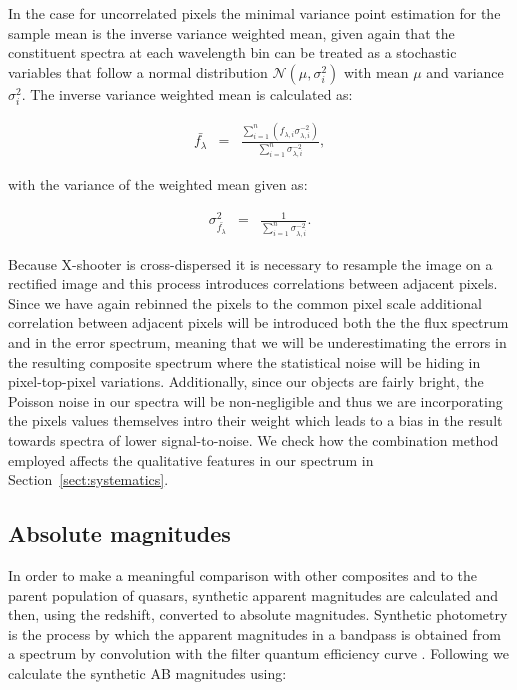 \documentclass{aa}    %
\newcommand{\eqlabel}[1]{\label{eq:#1}}
\newcommand{\sectionname}{Section}
\newcommand{\Sect}[1]{\sectionname~\ref{sect:#1}}
\newcommand{\sect}[1]{\Sect{#1}}
\newcommand{\sectlabel}[1]{\label{sect:#1}}
\begin{document}
In the case for uncorrelated pixels the minimal variance point estimation for the sample mean is the inverse variance weighted mean, given again that the constituent spectra at each wavelength bin can be treated as a stochastic variables that follow a normal distribution $\mathcal{N}(\mu, \sigma_i^2)$ with mean $\mu$ and variance $\sigma_i^2$. The inverse variance weighted mean is calculated as:

\begin{eqnarray} \eqlabel{wmean}
\bar{f_{\lambda}} &=& \frac{ \sum_{i=1}^n \left( f_{\lambda, i} \sigma_{\lambda, i}^{-2} \right)}{\sum_{i=1}^n \sigma_{\lambda, i}^{-2}},
\end{eqnarray}

with the variance of the weighted mean given as: 
 
\begin{eqnarray} \eqlabel{sigma-wmean}
\sigma_{\bar{f_{\lambda}}}^2 &=& \frac{ 1 }{\sum_{i=1}^n \sigma_{\lambda, i}^{-2}}.
\end{eqnarray}

Because X-shooter is cross-dispersed it is necessary to resample the image on a rectified image and this process introduces correlations between adjacent pixels. Since we have again rebinned the pixels to the common pixel scale additional correlation between adjacent pixels will be introduced both the the flux spectrum and in the error spectrum, meaning that we will be underestimating the errors in the resulting composite spectrum where the statistical noise will be hiding in pixel-top-pixel variations. Additionally, since our objects are fairly bright, the Poisson noise in our spectra will be non-negligible and thus we are incorporating the pixels values themselves intro their weight which leads to a bias in the result towards spectra of lower signal-to-noise. We check how the combination method employed affects the qualitative features in our spectrum in \sect{systematics}.

\subsection{Absolute magnitudes} \sectlabel{absmag}

In order to make a meaningful comparison with other composites and to the parent population of quasars, synthetic apparent magnitudes are calculated and then, using the redshift, converted to absolute magnitudes. Synthetic photometry is the process by which the apparent magnitudes in a bandpass is obtained from a spectrum by convolution with the filter quantum efficiency curve \cite{Bessell2005}. Following \citep{Bessell2012, Casagrande2014} we calculate the synthetic AB magnitudes using:
\end{document}
